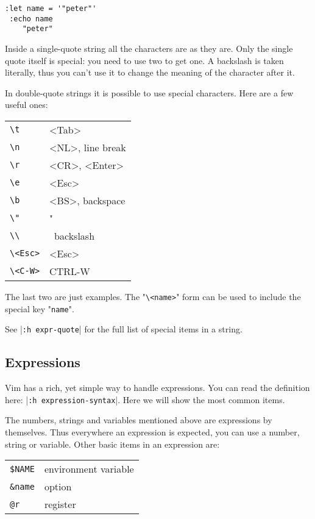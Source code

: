 \begin{Verbatim}[samepage=true]
 :let name = '"peter"'
 :echo name
    "peter"
\end{Verbatim}

Inside a single-quote string all the characters are as they are.
Only the single quote itself is special: you need to use two to get one.
A backslash is taken literally, thus you can't use it to change the meaning of the character after it.

In double-quote strings it is possible to use special characters.
Here are a few useful ones:

\begin{center} \begin{tabular}{l l}
				\verb!\t! & <Tab> \\
				\verb!\n! & <NL>, line break \\
				\verb!\r! & <CR>, <Enter> \\
				\verb!\e! & <Esc> \\
				\verb!\b! & <BS>, backspace \\
				\verb!\"! & " \\
				\verb!\\! & \, backslash \\
				\verb!\<Esc>! & <Esc> \\
				\verb!\<C-W>! & CTRL-W \\
\end{tabular} \end{center}

The last two are just examples.
The  "\verb!\<name>!" form can be used to include the special key "\verb!name!".

See |\verb!:h expr-quote!| for the full list of special items in a string.
\subsection{Expressions}
Vim has a rich, yet simple way to handle expressions.
You can read the definition here: |\texttt{:h expression-syntax}|.
Here we will show the most common items.

The numbers, strings and variables mentioned above are expressions by themselves.
Thus everywhere an expression is expected, you can use a number, string or variable.
Other basic items in an expression are:

\begin{center} \begin{tabular}{l l}
				\verb!$NAME! & environment variable \\
				\verb!&name! & option \\
				\verb!@r! & register \\
\end{tabular} \end{center}

